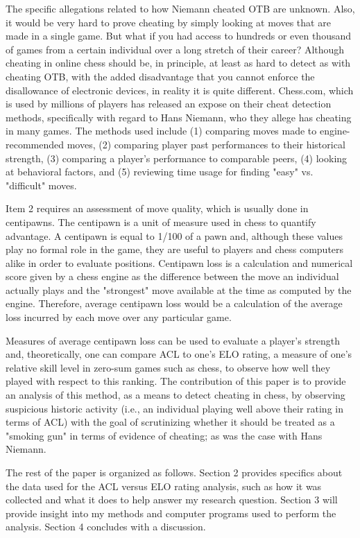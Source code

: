 \documentclass[12pt]{article}
\begin{document}
The specific allegations related to how Niemann cheated OTB are unknown. Also, it would be very hard to prove cheating by simply looking at moves that are made in a single game. But what if you had access to hundreds or even thousand of games from a certain individual over a long stretch of their career?
Although cheating in online chess should be, in principle, at least as hard to detect as with cheating OTB, with the added disadvantage that you cannot enforce the disallowance of electronic devices, in reality it is quite different. Chess.com, which is used by millions of players has released an expose on their cheat detection methods, specifically with regard to Hans Niemann, who they allege has cheating in many games. The methods used include (1) comparing moves made to engine-recommended moves, (2) comparing player past performances to their historical strength, (3) comparing a player's performance to comparable peers, (4) looking at behavioral factors, and (5) reviewing time usage for finding "easy" vs. "difficult" moves.  

Item 2 requires an assessment of move quality, which is usually done in centipawns. The centipawn is a unit of measure used in chess to quantify advantage. A centipawn is equal to 1/100 of a pawn and, although these values play no formal role in the game, they are useful to players and chess computers alike in order to evaluate positions. Centipawn loss is a calculation and numerical score given by a chess engine as the difference between the move an individual actually plays and the "strongest" move available at the time as computed by the engine. Therefore, average centipawn loss would be a calculation of the average loss incurred by each move over any particular game.

Measures of average centipawn loss can be used to evaluate a player's strength and, theoretically, one can compare ACL to one's ELO rating, a measure of one's relative skill level in zero-sum games such as chess, to observe how well they played with respect to this ranking. The contribution of this paper is to provide an analysis of this method, as a means to detect cheating in chess, by observing suspicious historic activity (i.e., an individual playing well above their rating in terms of ACL) with the goal of scrutinizing whether it should be treated as a "smoking gun" in terms of evidence of cheating; as was the case with Hans Niemann.

The rest of the paper is organized as follows. Section 2 provides specifics about the data used for the ACL versus ELO rating analysis, such as how it was collected and what it does to help answer my research question. Section 3 will provide insight into my methods and computer programs used to perform the analysis. Section 4 concludes with a discussion.
\end{document}
